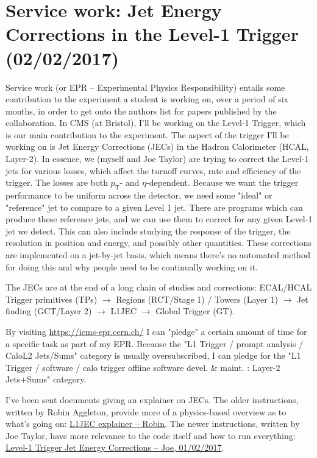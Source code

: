 \newpage
\chapter{Service work: Jet Energy Corrections in the Level-1 Trigger (02/02/2017)}

Service work (or EPR -- Experimental Physics Responsibility) entails some contribution to the experiment a student is working on, over a period of six months, in order to get onto the authors list for papers published by the collaboration. In CMS (at Bristol), I'll be working on the Level-1 Trigger, which is our main contribution to the experiment. The aspect of the trigger I'll be working on is Jet Energy Corrections (JECs) in the Hadron Calorimeter (HCAL, Layer-2). In essence, we (myself and Joe Taylor) are trying to correct the Level-1 jets for various losses, which affect the turnoff curves, rate and efficiency of the trigger. The losses are both $p_{\mathrm{T}}$- and $\eta$-dependent. Because we want the trigger performance to be uniform across the detector, we need some "ideal" or "reference" jet to compare to a given Level 1 jet. There are programs which can produce these reference jets, and we can use them to correct for any given Level-1 jet we detect. This can also include studying the response of the trigger, the resolution in position and energy, and possibly other quantities. These corrections are implemented on a jet-by-jet basis, which means there's no automated method for doing this and why people need to be continually working on it.

The JECs are at the end of a long chain of studies and corrections: ECAL/HCAL Trigger primitives (TPs) $\rightarrow$ Regions (RCT/Stage 1) / Towers (Layer 1) $\rightarrow$ Jet finding (GCT/Layer 2) $\rightarrow$ L1JEC $\rightarrow$ Global Trigger (GT).

By visiting \url{https://icms-epr.cern.ch/} I can "pledge" a certain amount of time for a specific task as part of my EPR. Because the "L1 Trigger / prompt analysis / CaloL2 Jets/Sums" category is usually oversubscribed, I can pledge for the "L1 Trigger / software / calo trigger offline software devel. \& maint. : Layer-2 Jets+Sums" category. 

I've been sent documents giving an explainer on JECs. The older instructions, written by Robin Aggleton, provide more of a physics-based overview as to what's going on: \href{run:./sec20/l1jec_explainer.pdf}{L1JEC explainer -- Robin}. The newer instructions, written by Joe Taylor, have more relevance to the code itself and how to run everything: \href{run:./sec20/2017_02_01_L1JECinstructions.pdf}{Level-1 Trigger Jet Energy Corrections -- Joe, 01/02/2017}.

